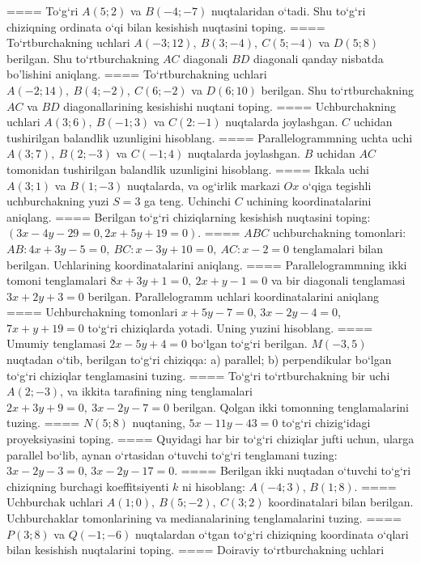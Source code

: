 ====
To‘g‘ri \(A (5;2) \) va \(B (-4; -7) \) nuqtalaridan o‘tadi.
Shu to‘g‘ri chiziqning ordinata o‘qi bilan kesishish nuqtasini toping.
====
To‘rtburchakning uchlari
\(A (-3;12),\ B (3;-4),\ C (5;-4) \) va \(D (5;8) \) berilgan. Shu
to‘rtburchakning $AC$ diagonali $BD$ diagonali qanday
nisbatda bo'lishini aniqlang.
====
To‘rtburchakning uchlari
\(A (-2;14),\ B (4;-2),\ C (6;-2) \) va \(D (6;10) \) berilgan. Shu
to‘rtburchakning $AC$ va $BD$ diagonallarining kesishishi
nuqtani toping.
====
Uchburchakning uchlari \(A (3;6),\ B (-1;3) \) va
\(C (2:-1) \) nuqtalarda joylashgan. $C$ uchidan tushirilgan balandlik uzunligini hisoblang.
====
Parallelogrammning uchta uchi \(A (3;7),\ B (2;-3) \) va
\(C (-1;4) \) nuqtalarda joylashgan. $B$ uchidan $AC$
tomonidan tushirilgan balandlik uzunligini hisoblang.
====
Ikkala uchi \(A (3;1) \) va \(B (1;-3) \) nuqtalarda, va
og‘irlik markazi $Ox$ o‘qiga tegishli uchburchakning yuzi
\(S=3\) ga teng. Uchinchi $C$ uchining koordinatalarini aniqlang.
====
Berilgan to‘g‘ri chiziqlarning kesishish nuqtasini toping:
$(3x-4y-29=0, 2x+5y+19=0)$.
====
$ABC$ uchburchakning tomonlari:
\(AB:4x+3y-5=0,\ BC:x-3y+10=0,\ AC:x-2=0\) 
tenglamalari bilan berilgan. Uchlarining koordinatalarini aniqlang.
====
Parallelogrammning ikki tomoni tenglamalari
\(8x+3y+1=0,\ 2x+y-1=0\) va bir diagonali tenglamasi
\(3x+2y+3=0\) berilgan. Parallelogramm uchlari koordinatalarini
aniqlang
====
Uchburchakning tomonlari \(x+5y-7=0\),
\(3x-2y-4=0\), \(7x+y+19=0\) to‘g‘ri chiziqlarda yotadi. Uning
yuzini hisoblang.
====
Umumiy tenglamasi \(2x-5y+4=0\) bo‘lgan to‘g‘ri
berilgan. \(M (-3,5) \) nuqtadan o‘tib, berilgan to‘g‘ri chiziqqa: a) parallel;
b) perpendikular bo‘lgan to‘g‘ri chiziqlar tenglamasini tuzing.
====
To‘g‘ri to‘rtburchakning bir uchi \(A (2;-3) \), va ikkita tarafining
ning tenglamalari \(2x+3y+9=0,\ 3x-2y-7=0\)
berilgan. Qolgan ikki tomonning tenglamalarini tuzing.
====
\(N (5;8) \) nuqtaning, \(5x-11y-43=0\) to‘g‘ri chizig‘idagi
proyeksiyasini toping.
====
Quyidagi har bir to‘g‘ri chiziqlar jufti uchun, ularga parallel
bo‘lib, aynan o‘rtasidan o‘tuvchi to‘g‘ri tenglamani tuzing: $3x-2y-3=0$, $3x-2y-17=0$.
====
Berilgan ikki nuqtadan o‘tuvchi to‘g‘ri chiziqning burchagi
koeffitsiyenti $k$ ni hisoblang: $A (-4;3) $, $B (1;8) $.
====
Uchburchak uchlari \(A (1;0),\ B (5;-2),\ C (3;2) \)
koordinatalari bilan berilgan. Uchburchaklar tomonlarining va
medianalarining tenglamalarini tuzing.
====
\(P (3;8) \) va \(Q (-1;-6) \) nuqtalardan o‘tgan
to‘g‘ri chiziqning koordinata o‘qlari bilan kesishish nuqtalarini toping.
====
Doiraviy to‘rtburchakning uchlari
